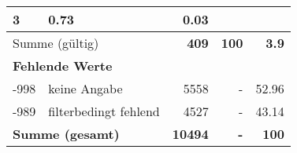 \begin{longtable}{lXrrr}
       \num{3} &
       \num[round-mode=places,round-precision=2]{0,73} &
         \num[round-mode=places,round-precision=2]{0,03} \\
     \midrule
     \multicolumn{2}{l}{Summe (gültig)} &
       \textbf{\num{409}} &
     \textbf{100} &
       \textbf{\num[round-mode=places,round-precision=2]{3,9}} \\
     \multicolumn{5}{l}{\textbf{Fehlende Werte}}\\
       -998 &
       keine Angabe &
         \num{5558} &
        - &
         \num[round-mode=places,round-precision=2]{52,96} \\
       -989 &
       filterbedingt fehlend &
         \num{4527} &
        - &
         \num[round-mode=places,round-precision=2]{43,14} \\
     \midrule
     \multicolumn{2}{l}{\textbf{Summe (gesamt)}} &
          \textbf{\num{10494}} &
        \textbf{-} &
        \textbf{100} \\
     \bottomrule
     \end{longtable}
     
